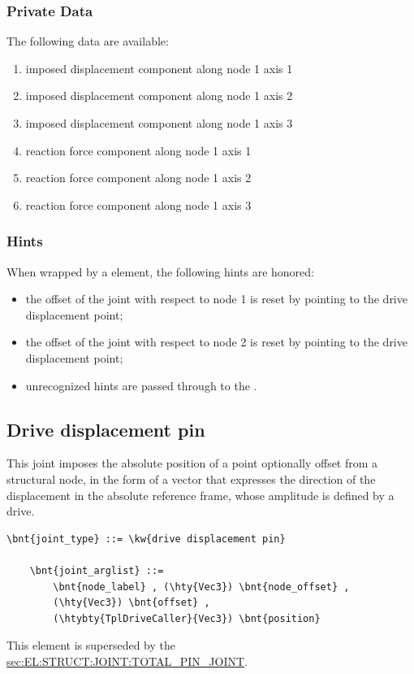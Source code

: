 \subsubsection{Private Data}
The following data are available:
\begin{enumerate}
\item {} imposed displacement component along node 1 axis 1
\item {} imposed displacement component along node 1 axis 2
\item {} imposed displacement component along node 1 axis 3
\item {} reaction force component along node 1 axis 1
\item {} reaction force component along node 1 axis 2
\item {} reaction force component along node 1 axis 3
\end{enumerate}

\subsubsection{Hints}
When wrapped by a  element, the following hints are honored:
\begin{itemize}
\item {} the offset of the joint
with respect to node 1 is reset by pointing 
to the drive displacement point;
\item {} the offset of the joint
with respect to node 2 is reset by pointing 
to the drive displacement point;
\item unrecognized hints are passed through to the .
\end{itemize}



\subsection{Drive displacement pin}
\label{sec:EL:JOINT:DRIVEDISPLACEMENTPIN}
This joint imposes the absolute position of a point optionally offset
from a structural node, in the form of a vector that expresses 
the direction of the displacement in the absolute reference frame,
whose amplitude is defined by a drive.
\begin{Verbatim}[commandchars=\\\{\}]
    \bnt{joint_type} ::= \kw{drive displacement pin}

    \bnt{joint_arglist} ::= 
        \bnt{node_label} , (\hty{Vec3}) \bnt{node_offset} ,
        (\hty{Vec3}) \bnt{offset} ,
        (\htybty{TplDriveCaller}{Vec3}) \bnt{position}
\end{Verbatim}
This element is superseded by the
\hyperref{\kw{total pin joint}}{\kw{total pin joint}, see Section~}{}{sec:EL:STRUCT:JOINT:TOTAL_PIN_JOINT}.

